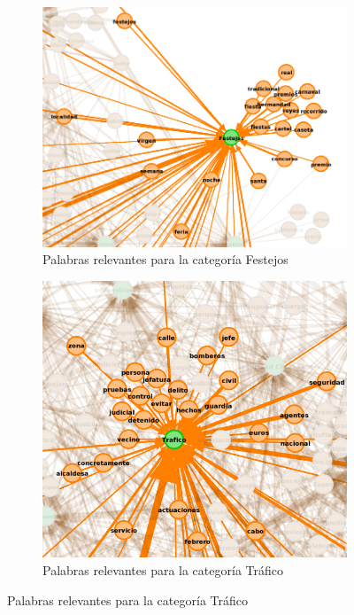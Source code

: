 \begin{figure}[h]
	\centering
	\begin{subfigure}[b]{0.54\textwidth}
		\includegraphics[scale=0.3]{Categorias/palabras_clave/festejos.png} 
		\caption{Palabras relevantes para la categoría Festejos}
	\end{subfigure} 
	\begin{subfigure}[b]{0.44\textwidth}
		\includegraphics[scale=0.3]{Categorias/palabras_clave/trafico.png} 
		\caption{Palabras relevantes para la categoría Tráfico}
	\end{subfigure}
\end{figure}










